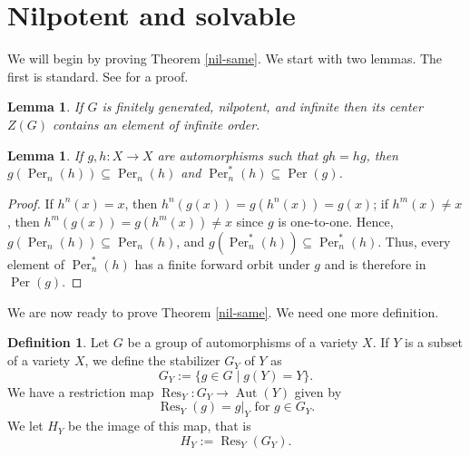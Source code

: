 \documentclass{amsart}
\newcommand{\lra}{\longrightarrow}
\newcommand{\bZ} {\mathbb{Z}}
\DeclareMathOperator{\Aut}{Aut}
\DeclareMathOperator{\Per}{Per}
\DeclareMathOperator{\Res}{Res}
\newcommand{\cX}{\mathcal X}
\newtheorem{lem}[thm]{Lemma}
\theoremstyle{definition}
\newtheorem{defn}[thm]{Definition}
\begin{document}

  
  
  
\section{Nilpotent and solvable} \label{nil-sec}


 



 We will begin by proving Theorem \ref{nil-same}.  We start with two
 lemmas.  The first is standard.  See \cite[5.2.22]{Robinson} for a
 proof.  
 
 \begin{lem}\label{center}
   If $G$ is finitely generated, nilpotent, and infinite then its center $Z(G)$
   contains an element of infinite order.
   \end{lem}
   
   

   \begin{lem}\label{commute-same}
If $g, h: X \lra X$ are automorphisms such that $gh = hg$, then
$g(\Per_n(h)) \subseteq \Per_n(h)$ and $\Per_n^*(h) \subseteq \Per(g)$.  
\end{lem}
\begin{proof}
  If $h^n(x) = x$, then $h^n(g(x)) = g (h^n(x)) = g(x)$; if
  $h^m(x) \not= x$, then $h^m(g(x)) = g (h^m(x)) \not= x$ since $g$ is
  one-to-one.  Hence, $g(\Per_n(h)) \subseteq \Per_n(h)$, and
  $g(\Per^*_n(h)) \subseteq \Per^*_n(h)$. Thus, every element of
  $\Per^*_n(h)$ has a finite forward orbit under $g$ and is therefore
  in $\Per(g)$.
\end{proof}

We are now ready to prove Theorem \ref{nil-same}.  We need one more
definition.

\begin{defn}
Let $G$ be a group of automorphisms of a variety $X$. If $Y$ is a
subset of a variety $X$, we define the stabilizer $G_Y$ of $Y$ as
\[ G_Y := \{ g \in G \; | \; g(Y) = Y \}. \]
We have a restriction map $\Res_Y: G_Y \lra \Aut(Y)$ given by
\[ \Res_Y(g) = g |_Y \text{ for $g \in G_Y$}. \]
We let $H_Y$ be the image of this map, that is
\[ H_Y := \Res_Y(G_Y). \]

\end{defn}
\end{document}
